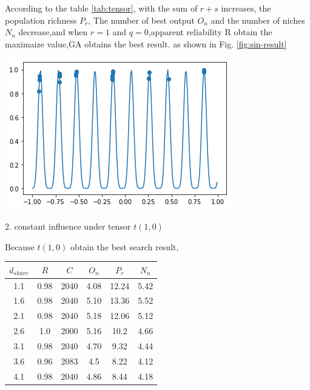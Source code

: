 \documentclass[smallextended]{svjour3}       %
\begin{document}
\begin{multicols}{2}
According to the table \ref{tab:tensor}, with the sum of $r+s$ increases, the
population richness $P_r$, The number of best output $O_n$ and the number of
niches $N_n$ decrease,and when $r=1$ and $q=0$,apparent reliability R obtain the
maximaize value,GA obtains the best result.  as shown in Fig.
\ref{fig:sin-result} 

\begin{center}
  \includegraphics[width=\linewidth]{GA_images/example-sin-result.png}
  \label{fig:sin-result}
\end{center}

2. constant influence under tensor $t(1,0)$

Because $t(1,0)$ obtain the best search result,

\begin{center}
\begin{tabular}{cccccc}
	\toprule
    $d_{share}$ & $R$ & $C$ & $O_{n}$ & $P_{r}$ & $N_{n}$\\
	\midrule
    1.1 & 0.98 & 2040 & 4.08 & 12.24 & 5.42 \\
    1.6 & 0.98 & 2040 & 5.10 & 13.36 & 5.52 \\
    2.1 & 0.98 & 2040 & 5.18 & 12.06 & 5.12 \\
    2.6 & 1.0  & 2000 & 5.16 & 10.2 & 4.66 \\
    3.1 & 0.98 & 2040 & 4.70 & 9.32 & 4.44 \\
    3.6 & 0.96 & 2083 & 4.5  & 8.22 & 4.12 \\
    4.1 & 0.98 & 2040 & 4.86 & 8.44 & 4.18 \\
	\bottomrule
\end{tabular}
\label{tab:d-share}
\end{center}


\end{multicols}
\end{document}
